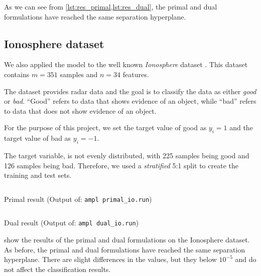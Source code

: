 As we can see from \cref{lst:res_primal,lst:res_dual},
the primal and dual formulations have
reached the same separation hyperplane.

\subsection{Ionosphere dataset}
We also applied the model to the well known \emph{Ionosphere} dataset%
\cite{noauthor_uci_nodate}. This dataset contains $m=351$ samples
and $n=34$ features. 

The dataset provides radar data and the goal is to classify
the data as either \emph{good} or \emph{bad}. ``Good'' refers to
data that shows evidence of an object, while ``bad'' refers to
data that does not show evidence of an object.

For the purpose of this project, we set the target value of good
as $y_i = 1$ and the target value of bad as $y_i = -1$.

The target variable, is not evenly distributed, with 225 samples
being good and 126 samples being bad. Therefore, we used a
\emph{stratified} 5:1 split to create the training and test sets.

\begin{listing}[H]
\inputminted[firstline=1,bgcolor=lightcodeBg]{text}{../outputs/primal_io.out}
\caption{Primal result (Output of: \texttt{ampl primal\_io.run})}
\label{lst:res_primal_io}
\end{listing}

\begin{listing}[H]
\inputminted[firstline=1,bgcolor=lightcodeBg]{text}{../outputs/dual_io.out}
\caption{Dual result (Output of: \texttt{ampl dual\_io.run})}
\label{lst:res_dual_io}
\end{listing}

 show the results of the
primal and dual formulations on the Ionosphere dataset. As before,
the primal and dual formulations have reached the same separation
hyperplane. There are slight differences in the values, but they
below $10^{-5}$ and do not affect the classification results.
